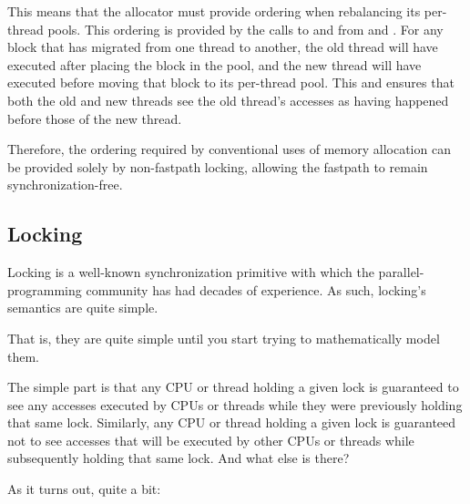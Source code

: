This means that the allocator must provide ordering when rebalancing
its per-thread pools.
This ordering is provided by the calls to  and
 from  and .
For any block that has migrated from one thread to another, the old
thread will have executed  after
placing the block in the  pool, and the new thread will
have executed  before moving that
block to its per-thread pool.
This  and  ensures that both the
old and new threads see the old thread's accesses as having happened
before those of the new thread.

\QuickQuizEnd

Therefore, the ordering required by conventional uses of memory allocation
can be provided solely by non-fastpath locking, allowing the fastpath to
remain synchronization-free.

\subsection{Locking}
\label{sec:memorder:Locking}

Locking is a well-known synchronization primitive with which the
parallel-programming community has had decades of experience.
As such, locking's semantics are quite simple.

That is, they are quite simple until you start trying to mathematically
model them.

The simple part is that any CPU or thread holding a given lock is
guaranteed to see any accesses executed by CPUs or threads while they
were previously holding that same lock.
Similarly, any CPU or thread holding a given lock is guaranteed not
to see accesses that will be executed by other CPUs or threads while
subsequently holding that same lock.
And what else is there?

As it turns out, quite a bit:

